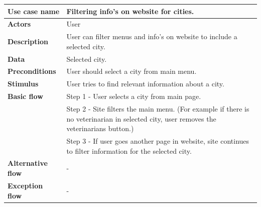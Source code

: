 \begin{center}
    \begin{table}[H]
        \begin{tabular}{| m{3cm}| m{10cm} |}
            \hline
            \textbf{Use case name}    & Filtering info's on website for cities.                                                                                                 \\
            \hline
            \textbf{Actors}           & User                                                                                                                                    \\
            \hline
            \textbf{Description}      & User can filter menus and info's on website to include a selected city.                                                                 \\
            \hline
            \textbf{Data}             & Selected city.                                                                                                                          \\
            \hline
            \textbf{Preconditions}    & User should select a city from main menu.                                                                                               \\
            \hline
            \textbf{Stimulus}         & User tries to find relevant information about a city.                                                                                   \\
            \hline
            \textbf{Basic flow}       & Step 1 - User selects a city from main page.                                                                                            \\
                                      & Step 2 - Site filters the main menu. (For example if there is no veterinarian in selected city, user removes the veterinarians button.) \\
                                      & Step 3 - If user goes another page in website, site continues to filter information for the selected city.                              \\
            \hline
            \textbf{Alternative flow} & -                                                                                                                                       \\
            \hline
            \textbf{Exception flow}   & -                                                                                                                                       \\

\end{tabular}
\end{table}
\end{center}
